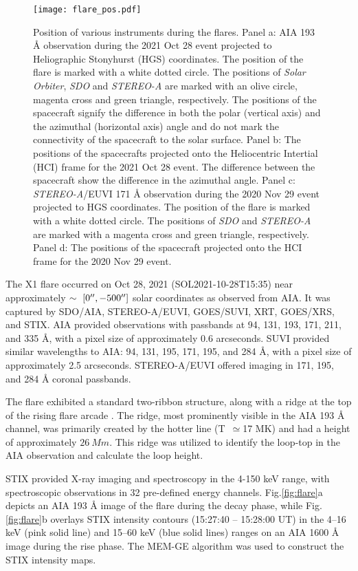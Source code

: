 \begin{figure}[ht!]
    \centering
    \texttt{[image: flare\_pos.pdf]}
    \caption{Position of various instruments during the flares. Panel a: AIA 193 {\AA} observation during the 2021 Oct 28 event projected to Heliographic Stonyhurst (HGS) coordinates. The position of the flare is marked with a white dotted circle. The positions of {\it Solar Orbiter}, {\it SDO} and {\it STEREO-A} are marked with an olive circle, magenta cross and green triangle, respectively. The positions of the spacecraft signify the difference in both the polar (vertical axis) and the azimuthal (horizontal axis) angle and do not mark the connectivity of the spacecraft to the solar surface. Panel b: The positions of the spacecrafts projected onto the Heliocentric Intertial (HCI) frame for the 2021 Oct 28 event. The difference between the spacecraft show the difference in the azimuthal angle. Panel c: {\it STEREO-A}/EUVI 171 {\AA} observation during the 2020 Nov 29 event projected to HGS coordinates. The position of the flare is marked with a white dotted circle. The positions of {\it SDO} and {\it STEREO-A} are marked with a magenta cross and green triangle, respectively. Panel d: The positions of the spacecraft projected onto the HCI frame for the 2020 Nov 29 event.}
    \label{fig:sc_pos}
\end{figure}

The X1 flare occurred on Oct 28, 2021 (SOL2021-10-28T15:35) near approximately $\sim~[0\hbox{$^{\prime\prime}$},-500\hbox{$^{\prime\prime}$}]$ solar coordinates as observed from AIA. It was captured by SDO/AIA, STEREO-A/EUVI, GOES/SUVI, XRT, GOES/XRS, and STIX. AIA provided observations with passbands at 94, 131, 193, 171, 211, and 335 Å, with a pixel size of approximately 0.6 arcseconds. SUVI provided similar wavelengths to AIA: 94, 131, 195, 171, 195, and 284 Å, with a pixel size of approximately 2.5 arcseconds. STEREO-A/EUVI offered imaging in 171, 195, and 284 Å coronal passbands.

The flare exhibited a standard two-ribbon structure, along with a ridge at the top of the rising flare arcade \citep{longcope22}. The ridge, most prominently visible in the AIA 193 Å channel, was primarily created by the hotter  line (T~$\simeq$17 MK) and had a height of approximately $26~Mm$. This ridge was utilized to identify the loop-top in the AIA observation and calculate the loop height.

STIX provided X-ray imaging and spectroscopy in the 4-150 keV range, with spectroscopic observations in 32 pre-defined energy channels. Fig.\ref{fig:flare}a depicts an AIA 193 Å image of the flare during the decay phase, while Fig.\ref{fig:flare}b overlays STIX intensity contours (15:27:40 {--} 15:28:00 UT) in the 4{--}16 keV (pink solid line) and 15{--}60 keV (blue solid lines) ranges on an AIA 1600 Å image during the rise phase. The MEM-GE algorithm was used to construct the STIX intensity maps.

